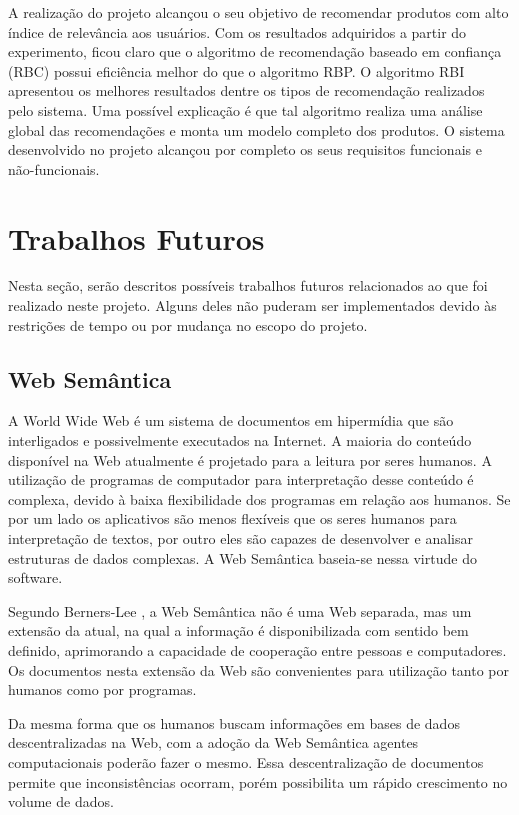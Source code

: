   A realização do projeto alcançou o seu objetivo de recomendar produtos com alto índice de relevância aos usuários. Com os resultados adquiridos a partir do experimento, ficou claro que o algoritmo de recomendação baseado em confiança (RBC) possui eficiência melhor do que o algoritmo RBP. O algoritmo RBI apresentou os melhores resultados dentre os tipos de recomendação realizados pelo sistema. Uma possível explicação é que tal algoritmo realiza uma análise global das recomendações e monta um modelo completo dos produtos. O sistema desenvolvido no projeto alcançou por completo os seus requisitos funcionais e não-funcionais.


\section{Trabalhos Futuros}
\label{sec:trabalho_futuros}

 Nesta seção, serão descritos possíveis trabalhos futuros relacionados ao que foi realizado neste projeto. Alguns deles não puderam ser implementados devido às restrições de tempo ou por mudança no escopo do projeto.

\subsection{Web Semântica} %
\label{sub:web_semantica}

 A World Wide Web é um sistema de documentos em hipermídia que são interligados e possivelmente executados na Internet. A maioria do conteúdo disponível na Web atualmente é projetado para a leitura por seres humanos. A utilização de programas de computador para interpretação desse conteúdo é complexa, devido à baixa flexibilidade dos programas em relação aos humanos. Se por um lado os aplicativos são menos flexíveis que os seres humanos para interpretação de textos, por outro eles são capazes de desenvolver e analisar estruturas de dados complexas. A Web Semântica baseia-se nessa virtude do software. 

 Segundo Berners-Lee \cite{bemerslee2001sw}, a Web Semântica não é uma Web separada, mas um extensão da atual, na qual a informação é disponibilizada com sentido bem definido, aprimorando a capacidade de cooperação entre pessoas e computadores. Os documentos nesta extensão da Web são convenientes para utilização tanto por humanos como por programas.

 Da mesma forma que os humanos buscam informações em bases de dados descentralizadas na Web, com a adoção da Web Semântica agentes computacionais poderão fazer o mesmo. Essa descentralização de documentos permite que inconsistências ocorram, porém possibilita um rápido crescimento no volume de dados.

